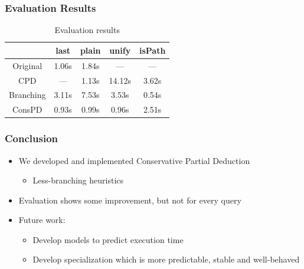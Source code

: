 \documentclass[xcolor=table]{beamer}
\begin{document}
\begin{frame}[fragile]
  \frametitle{Evaluation Results}

  \begin{table}
    \centering
    \begin{tabular}{c||c|c||c||c}
                     & last  & plain & unify  & isPath \\ \hline\hline
    Original         & 1.06s & 1.84s & ---    & ---    \\ \hline
    CPD              & ---   & 1.13s & 14.12s & 3.62s  \\ \hline
    Branching        & 3.11s & 7.53s & 3.53s  & \cellcolor{green!20}0.54s  \\ \hline
    ConsPD           & \cellcolor{green!20}0.93s & \cellcolor{green!20}0.99s & \cellcolor{green!20}0.96s  & 2.51s  \\ \hline
    \end{tabular}

    \caption{Evaluation results}
  \end{table}

\end{frame}

\begin{frame}[fragile]
  \frametitle{Conclusion}
  \begin{itemize}
    \item We developed and implemented Conservative Partial Deduction
    \begin{itemize}
      \item Less-branching heuristics
    \end{itemize}
    \item Evaluation shows some improvement, but not for every query
    \item Future work:
    \begin{itemize}
      \item Develop models to predict execution time
      \item Develop specialization which is more predictable, stable and well-behaved
    \end{itemize}
  \end{itemize}
\end{frame}
\end{document}
